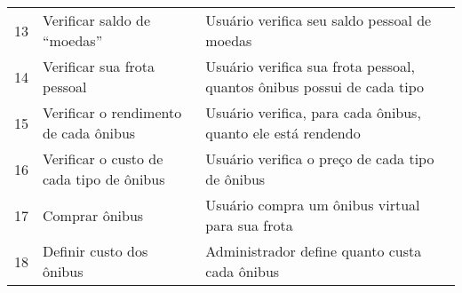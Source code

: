 \begin{table}[H]
\begin{tabular}{lll}
			13 & Verificar saldo de “moedas”                                & \begin{minipage}{0.5\textwidth}\espacoVert Usuário verifica seu saldo pessoal de moedas \espacoVert \end{minipage} \\
			14 & Verificar sua frota pessoal                                & \begin{minipage}{0.5\textwidth}\espacoVert Usuário verifica sua frota pessoal, quantos ônibus possui de cada tipo \espacoVert \end{minipage} \\
			15 & \begin{minipage}{0.3\textwidth}\espacoVert Verificar o rendimento de cada ônibus \espacoVert \end{minipage}                     & \begin{minipage}{0.5\textwidth}\espacoVert Usuário verifica, para cada ônibus, quanto ele está rendendo \espacoVert \end{minipage} \\
			16 & \begin{minipage}{0.3\textwidth}\espacoVert Verificar o custo de cada tipo de ônibus \espacoVert \end{minipage}                  & \begin{minipage}{0.5\textwidth}\espacoVert Usuário verifica o preço de cada tipo de ônibus \espacoVert \end{minipage} \\
			17 & Comprar ônibus                                             & Usuário compra um ônibus virtual para sua frota \\
			18 & Definir custo dos ônibus                                   & \begin{minipage}{0.5\textwidth}\espacoVert Administrador define quanto custa cada ônibus \espacoVert \end{minipage} \\
			

	    \bottomrule
    \end{tabular}
\end{table}
                                                                

